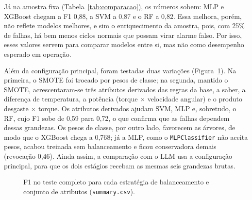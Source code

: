 \documentclass[12pt]{article}
\begin{document}
Já na amostra fixa (Tabela~\ref{tab:comparacao}), os números sobem: MLP e XGBoost chegam a F1 0,88, a SVM a 0,87 e o RF a 0,82. Essa melhora, porém, não reflete modelos melhores, e sim o enriquecimento da amostra, pois, com 25\% de falhas, há bem menos ciclos normais que possam virar alarme falso. Por isso, esses valores servem para comparar modelos entre si, mas não como desempenho esperado em operação.

Além da configuração principal, foram testadas duas variações (Figura~\ref{fig:variacoes}). Na primeira, o SMOTE foi trocado por pesos de classe; na segunda, mantido o SMOTE, acrescentaram-se três atributos derivados das regras da base, a saber, a diferença de temperatura, a potência (torque $\times$ velocidade angular) e o produto desgaste $\times$ torque. Os atributos derivados ajudam SVM, MLP e, sobretudo, o RF, cujo F1 sobe de 0,59 para 0,72, o que confirma que as falhas dependem dessas grandezas. Os pesos de classe, por outro lado, favorecem as árvores, de modo que o XGBoost chega a 0,768; já a MLP, como o \texttt{MLPClassifier} não aceita pesos, acabou treinada sem balanceamento e ficou conservadora demais (revocação 0,46). Ainda assim, a comparação com o LLM usa a configuração principal, para que os dois estágios recebam as mesmas seis grandezas brutas.

\begin{figure}[ht]
\centering
{}
\caption{F1 no teste completo para cada estratégia de balanceamento e conjunto de atributos (\texttt{summary.csv}).}
\label{fig:variacoes}
\end{figure}
\end{document}
